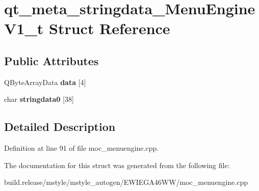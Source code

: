 \hypertarget{structqt__meta__stringdata___menu_engine_v1__t}{}\section{qt\+\_\+meta\+\_\+stringdata\+\_\+\+Menu\+Engine\+V1\+\_\+t Struct Reference}
\label{structqt__meta__stringdata___menu_engine_v1__t}
\subsection*{Public Attributes}
\begin{DoxyCompactItemize}
\item 
\mbox{\label{structqt__meta__stringdata___menu_engine_v1__t_a93764d482a6a46cbc4526e1b8b5092e4}} 
Q\+Byte\+Array\+Data {\bfseries data} \mbox{[}4\mbox{]}
\item 
\mbox{\label{structqt__meta__stringdata___menu_engine_v1__t_ab7eada8ad83ed4ed539bcf1dc35ae1eb}} 
char {\bfseries stringdata0} \mbox{[}38\mbox{]}
\end{DoxyCompactItemize}


\subsection{Detailed Description}


Definition at line 91 of file moc\+\_\+menuengine.\+cpp.



The documentation for this struct was generated from the following file\+:\begin{DoxyCompactItemize}
\item 
build.\+release/mstyle/mstyle\+\_\+autogen/\+E\+W\+I\+E\+G\+A46\+W\+W/moc\+\_\+menuengine.\+cpp\end{DoxyCompactItemize}
